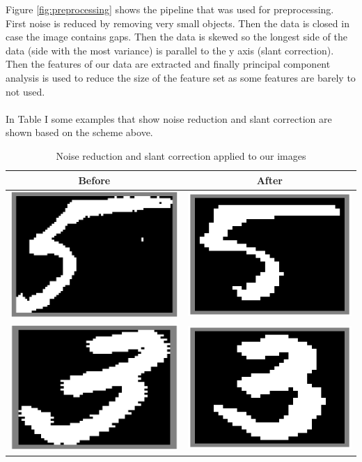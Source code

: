 \documentclass[%
        compressed,
        final,
        notitlepage,
        narroweqnarray,
        inline,
        twoside,
        ]{ieee}
\begin{document}
Figure \ref{fig:preprocessing} shows the pipeline that was used for preprocessing. First noise is reduced by removing very small objects. Then the data is closed in case the image contains gaps. Then the data is skewed so the longest side of the data (side with the most variance) is parallel to the y axis (slant correction). Then the features of our data are extracted and finally principal component analysis is used to reduce the size of the feature set as some features are barely to not used.\\\\
In Table I some examples that show noise reduction and slant correction
are shown based on the scheme above.
\begin{table}
    \begin{tabular}{|c|c|}
        \hline
        Before & After \\
        \hline
    \includegraphics[width=.4\columnwidth]{images/dirty5.png}
    &\includegraphics[width=.4\columnwidth]{images/clean5.png}\\
    \includegraphics[width=.4\columnwidth]{images/dirty3.png}
    &\includegraphics[width=.4\columnwidth]{images/clean3.png}\\
        \hline
    \end{tabular}
    \caption{Noise reduction and slant correction applied to our images}
\end{table}
\end{document}
